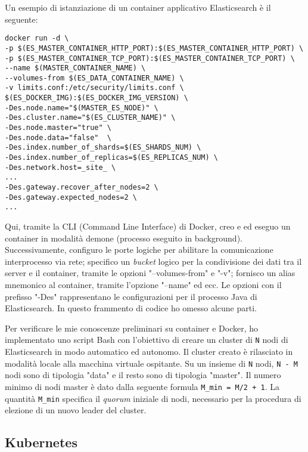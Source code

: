 Un esempio di istanziazione di un container applicativo
Elasticsearch è il seguente:
 
\begin{verbatim}
docker run -d \
-p $(ES_MASTER_CONTAINER_HTTP_PORT):$(ES_MASTER_CONTAINER_HTTP_PORT) \
-p $(ES_MASTER_CONTAINER_TCP_PORT):$(ES_MASTER_CONTAINER_TCP_PORT) \
--name $(MASTER_CONTAINER_NAME) \
--volumes-from $(ES_DATA_CONTAINER_NAME) \
-v limits.conf:/etc/security/limits.conf \
$(ES_DOCKER_IMG):$(ES_DOCKER_IMG_VERSION) \
-Des.node.name="$(MASTER_ES_NODE)" \
-Des.cluster.name="$(ES_CLUSTER_NAME)" \
-Des.node.master="true" \
-Des.node.data="false"  \
-Des.index.number_of_shards=$(ES_SHARDS_NUM) \
-Des.index.number_of_replicas=$(ES_REPLICAS_NUM) \
-Des.network.host=_site_ \
...
-Des.gateway.recover_after_nodes=2 \
-Des.gateway.expected_nodes=2 \
...		 
\end{verbatim}

Qui, tramite la CLI (Command Line Interface) di Docker, creo e 
ed eseguo un container in modalità demone (processo eseguito in background). 
Successivamente, configuro le porte logiche per abilitare la 
comunicazione interprocesso via rete; specifico un \textit{bucket} 
logico per la condivisione dei dati tra il server e il container, 
tramite le opzioni "--volumes-from" e "-v";  fornisco un alias 
mnemonico al container, tramite l'opzione "--name" ed ecc.
Le opzioni con il prefisso "-Des" rappresentano le configurazioni 
per il processo Java di Elasticsearch. In questo frammento di codice
ho omesso alcune parti.
 
Per verificare le mie conoscenze preliminari su container e Docker, 
ho implementato uno script Bash con l'obiettivo di creare un 
cluster di \texttt{N} nodi di Elasticsearch 
in modo automatico ed autonomo.  Il cluster creato è rilasciato 
in modalità locale alla macchina virtuale ospitante.
Su un insieme di \texttt{N} nodi, \texttt{N - M} nodi sono di 
tipologia "data" e il resto sono di tipologia "master". 
Il numero minimo di nodi master è dato dalla 
seguente formula \texttt{M\_min = M/2 + 1}. 
La quantità \texttt{M\_min} specifica il \textit{quorum} 
iniziale di nodi, necessario per la procedura di elezione 
di un nuovo leader del cluster. 

\subsection{Kubernetes}

